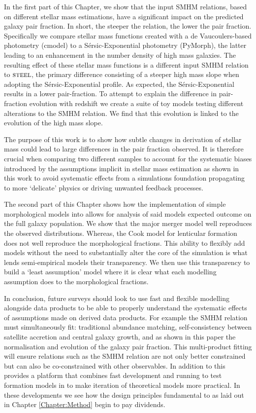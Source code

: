 In the first part of this Chapter, we show that the input SMHM relations, based on different stellar mass estimations, have a significant impact on the predicted galaxy pair fraction. In short, the steeper the relation, the lower the pair fraction. Specifically we compare stellar mass functions created with a de Vaucoulers-based photometry (cmodel) to a S\'ersic-Exponential photometry (PyMorph), the latter leading to an enhancement in the number density of high mass galaxies. The resulting effect of these stellar mass functions is a different input SMHM relation to $\textsc{steel}$, the primary difference consisting of a steeper high mass slope when adopting the S\'ersic-Exponential profile. As expected, the S\'ersic-Exponential results in a lower pair-fraction. To attempt to explain the difference in pair-fraction evolution with redshift we create a suite of toy models testing different alterations to the SMHM relation. We find that this evolution is linked to the evolution of the high mass slope.

The purpose of this work is to show how subtle changes in derivation of stellar mass could lead to large differences in the pair fraction observed. It is therefore crucial when comparing two different samples to account for the systematic biases introduced by the assumptions implicit in stellar mass estimation as shown in this work to avoid systematic effects from a simulations foundation propagating to more `delicate' physics or driving unwanted feedback processes.

The second part of this Chapter shows how the implementation of simple morphological models into \steel allows for analysis of said models expected outcome on the full galaxy population. We show that the major merger model well reproduces the observed distributions. Whereas, the Cook model for lenticular formation does not well reproduce the morphological fractions. This ability to flexibly add models without the need to substantially alter the core of the simulation is what lends semi-empirical models their transparency. We then use this transparency to build a `least assumption' model where it is clear what each modelling assumption does to the morphological fractions.

In conclusion, future surveys should look to use fast and flexible modelling alongside data products to be able to properly understand the systematic effects of assumptions made on derived data products. For example the SMHM relation must simultaneously fit: traditional abundance matching, self-consistency between satellite accretion and central galaxy growth, and as shown in this paper the normalisation and evolution of the galaxy pair fraction. This multi-product fitting will ensure relations such as the SMHM relation are not only better constrained but can also be co-constrained with other observables. In addition to this \steel provides a platform that combines fast development and running to test formation models in to make iteration of theoretical models more practical. In these developments we see how the design principles fundamental to \steel as laid out in Chapter \ref{Chapter:Method} begin to pay dividends.
